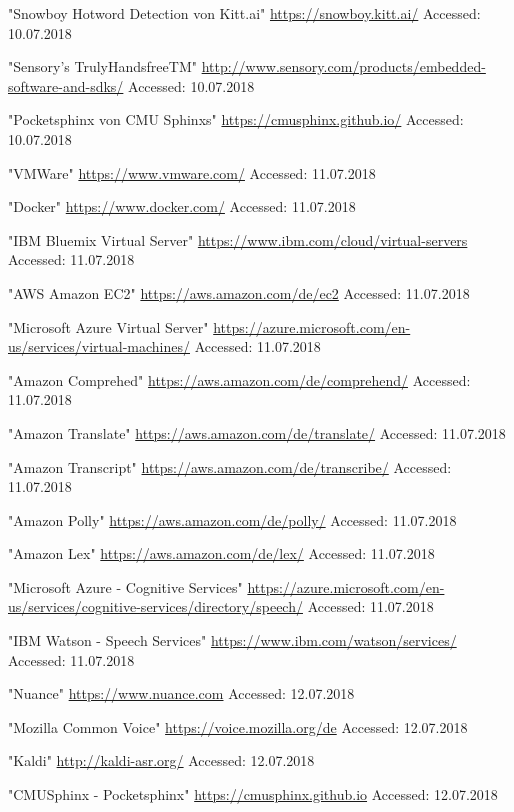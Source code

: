 \documentclass[journal]{IEEEtran}
\begin{document}
\ifCLASSOPTIONcaptionsoff
  \newpage
\fi

\begin{thebibliography}{1}
"Snowboy Hotword Detection von Kitt.ai"
\url{https://snowboy.kitt.ai/}
Accessed: 10.07.2018

"Sensory's TrulyHandsfreeTM"
\url{http://www.sensory.com/products/embedded-software-and-sdks/}
Accessed: 10.07.2018

"Pocketsphinx von CMU Sphinxs"
\url{https://cmusphinx.github.io/}
Accessed: 10.07.2018

"VMWare"
\url{https://www.vmware.com/}
Accessed: 11.07.2018

"Docker"
\url{https://www.docker.com/}
Accessed: 11.07.2018

"IBM Bluemix Virtual Server"
\url{https://www.ibm.com/cloud/virtual-servers}
Accessed: 11.07.2018

"AWS Amazon EC2"
\url{https://aws.amazon.com/de/ec2}
Accessed: 11.07.2018

"Microsoft Azure Virtual Server"
\url{https://azure.microsoft.com/en-us/services/virtual-machines/}
Accessed: 11.07.2018

"Amazon Comprehed"
\url{https://aws.amazon.com/de/comprehend/}
Accessed: 11.07.2018

"Amazon Translate"
\url{https://aws.amazon.com/de/translate/}
Accessed: 11.07.2018

"Amazon Transcript"
\url{https://aws.amazon.com/de/transcribe/}
Accessed: 11.07.2018

"Amazon Polly"
\url{https://aws.amazon.com/de/polly/}
Accessed: 11.07.2018

"Amazon Lex"
\url{https://aws.amazon.com/de/lex/}
Accessed: 11.07.2018

"Microsoft Azure - Cognitive Services"
\url{https://azure.microsoft.com/en-us/services/cognitive-services/directory/speech/}
Accessed: 11.07.2018

"IBM Watson - Speech Services"
\url{https://www.ibm.com/watson/services/}
Accessed: 11.07.2018

"Nuance"
\url{https://www.nuance.com}
Accessed: 12.07.2018

"Mozilla Common Voice"
\url{https://voice.mozilla.org/de}
Accessed: 12.07.2018

"Kaldi"
\url{http://kaldi-asr.org/}
Accessed: 12.07.2018

"CMUSphinx - Pocketsphinx"
\url{https://cmusphinx.github.io}
Accessed: 12.07.2018
\end{thebibliography}
\end{document}
